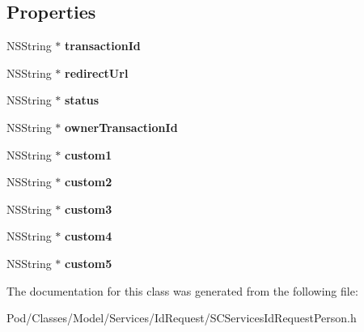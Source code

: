 \subsection*{Properties}
\begin{DoxyCompactItemize}
\item 
N\+S\+String $\ast$ {\bfseries transaction\+Id}\hypertarget{interface_s_c_services_id_request_person_add745a25caafaf09abdd028da6b30dd3}{}\label{interface_s_c_services_id_request_person_add745a25caafaf09abdd028da6b30dd3}

\item 
N\+S\+String $\ast$ {\bfseries redirect\+Url}\hypertarget{interface_s_c_services_id_request_person_a8e15edbfd67ac4d7b53ae40f08ae7f07}{}\label{interface_s_c_services_id_request_person_a8e15edbfd67ac4d7b53ae40f08ae7f07}

\item 
N\+S\+String $\ast$ {\bfseries status}\hypertarget{interface_s_c_services_id_request_person_a55996b29c8e9503fe606e4868aa42228}{}\label{interface_s_c_services_id_request_person_a55996b29c8e9503fe606e4868aa42228}

\item 
N\+S\+String $\ast$ {\bfseries owner\+Transaction\+Id}\hypertarget{interface_s_c_services_id_request_person_a0c7cb11639126cbd7b85527b05efca49}{}\label{interface_s_c_services_id_request_person_a0c7cb11639126cbd7b85527b05efca49}

\item 
N\+S\+String $\ast$ {\bfseries custom1}\hypertarget{interface_s_c_services_id_request_person_a3bb8afbaf4af4ee67f3b0561d81768dc}{}\label{interface_s_c_services_id_request_person_a3bb8afbaf4af4ee67f3b0561d81768dc}

\item 
N\+S\+String $\ast$ {\bfseries custom2}\hypertarget{interface_s_c_services_id_request_person_ab8a46cd63eb1835037985569416fe439}{}\label{interface_s_c_services_id_request_person_ab8a46cd63eb1835037985569416fe439}

\item 
N\+S\+String $\ast$ {\bfseries custom3}\hypertarget{interface_s_c_services_id_request_person_a3f037b1353e638664f84c35bc42133b6}{}\label{interface_s_c_services_id_request_person_a3f037b1353e638664f84c35bc42133b6}

\item 
N\+S\+String $\ast$ {\bfseries custom4}\hypertarget{interface_s_c_services_id_request_person_aa5910d245c804c17e2c32a0bff89beed}{}\label{interface_s_c_services_id_request_person_aa5910d245c804c17e2c32a0bff89beed}

\item 
N\+S\+String $\ast$ {\bfseries custom5}\hypertarget{interface_s_c_services_id_request_person_ac614463dfb808bd62410c77d2770215c}{}\label{interface_s_c_services_id_request_person_ac614463dfb808bd62410c77d2770215c}

\end{DoxyCompactItemize}


The documentation for this class was generated from the following file\+:\begin{DoxyCompactItemize}
\item 
Pod/\+Classes/\+Model/\+Services/\+Id\+Request/S\+C\+Services\+Id\+Request\+Person.\+h\end{DoxyCompactItemize}
